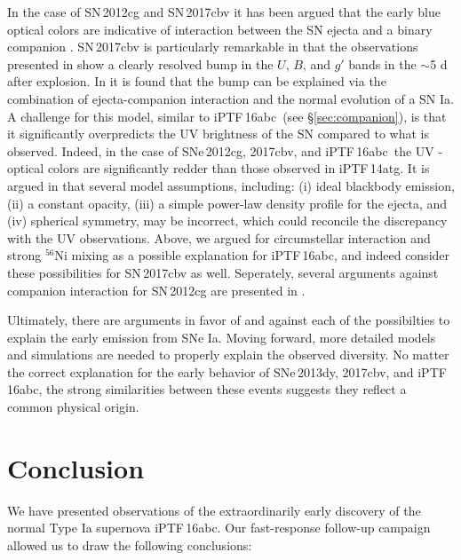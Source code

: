 \documentclass[twocolumn]{aastex61}
\newcommand{\abc}{iPTF\,16abc}
\begin{document}
In the case of SN\,2012cg and SN\,2017cbv it has been argued that the early blue optical colors are indicative of interaction between the SN ejecta and a binary companion \citep{2016ApJ...820...92M,2017arXiv170608990H}. SN\,2017cbv is particularly remarkable in that the observations presented in \citet{2017arXiv170608990H} show a clearly resolved bump in the $U$, $B$, and $g'$ bands in the $\sim$5 d after explosion. In \citeauthor{2017arXiv170608990H} it is found that the bump can be explained via the combination of ejecta-companion interaction and the normal evolution of a SN Ia. A challenge for this model, similar to \abc\ (see \S\ref{sec:companion}), is that it significantly overpredicts the UV brightness of the SN compared to what is observed. Indeed, in the case of SNe\,2012cg, 2017cbv, and \abc\ the UV - optical colors are significantly redder than those observed in iPTF\,14atg. It is argued in \citet{2017arXiv170608990H} that several model assumptions, including: (i) ideal blackbody emission, (ii) a constant opacity, (iii) a simple power-law density profile for the ejecta, and (iv) spherical symmetry, may be incorrect, which could reconcile the discrepancy with the UV observations. Above, we argued for circumstellar interaction and strong $^{56}$Ni mixing as a possible explanation for \abc, and indeed \citet{2017arXiv170608990H} consider these possibilities for SN\,2017cbv as well. Seperately, several arguments against companion interaction for SN\,2012cg are presented in \citet{2016arXiv161007601S}. 

Ultimately, there are arguments in favor of and against each of the possibilties to explain the early emission from SNe Ia. Moving forward, more detailed models and simulations are needed to properly explain the observed diversity. No matter the correct explanation for the early behavior of SNe\,2013dy, 2017cbv, and \abc, the strong similarities between these events suggests they reflect a common physical origin. 

\section{Conclusion}
\label{sec:conclusion}

We have presented observations of the extraordinarily early discovery of the 
normal Type Ia supernova \abc. Our fast-response follow-up 
campaign allowed us to draw the following conclusions:
\end{document}
